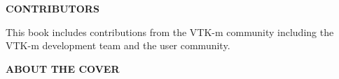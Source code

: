 \begin{centering}
{\bf CONTRIBUTORS}\\
\vspace{2em}
\end{centering}

This book includes contributions from the VTK-m community including the
VTK-m development team and the user community.





\begin{centering}
{\bf ABOUT THE COVER}\\
\vspace{2em}
\end{centering}


